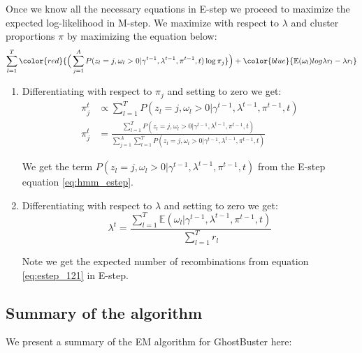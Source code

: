 Once we know all the necessary equations in E-step we proceed to maximize the expected log-likelihood in M-step. We maximize with respect to $\lambda$ and cluster proportions $\pi$ by maximizing the equation below: 
\begin{equation}
    \sum\limits_{l=1}^{T}  \color{red}{ \Big( \sum\limits_{j=1}^{A} P(z_l = j, \omega_l > 0 \vert \gamma^{t-1}, \lambda^{t-1}, \pi^{t-1}, t) \log \pi_j} \Big) + \color{blue}{\mathbb{E}(\omega_l) log \lambda r_l - \lambda r_l }
\end{equation}

\begin{enumerate}
    \item Differentiating with respect to $\pi_j$ and setting to zero we get:  
    \begin{align}
        \pi^{t}_j &\propto \sum\limits_{l=1}^{T} P(z_l = j, \omega_l > 0 \vert \gamma^{t-1}, \lambda^{t-1}, \pi^{t-1}, t) \nonumber \\
        \pi^{t}_j &= \frac{\sum\limits_{l=1}^{T} P(z_l = j, \omega_l > 0 \vert \gamma^{t-1}, \lambda^{t-1}, \pi^{t-1}, t)}{\sum\limits_{j=1}^{A} \sum\limits_{l=1}^{T} P(z_l = j, \omega_l > 0 \vert \gamma^{t-1}, \lambda^{t-1}, \pi^{t-1}, t)}
    \label{eq:pi_updates}
    \end{align}
    
    We get the term $P(z_l = j, \omega_l > 0 \vert \gamma^{t-1}, \lambda^{t-1}, \pi^{t-1}, t)$ from the E-step equation \ref{eq:hmm_estep}. 
    \item Differentiating with respect to $\lambda$ and setting to zero we get:
    \begin{equation}
        \lambda^t = \frac{\sum\limits_{l=1}^{T}\mathbb{E}(\omega_l \vert \gamma^{t-1}, \lambda^{t-1}, \pi^{t-1}, t)}{\sum\limits_{l=1}^{T}r_l}
    \label{eq:lambda_updates}
    \end{equation}
    
    Note we get the expected number of recombinations from equation \ref{eq:estep_121} in E-step.
    
\end{enumerate}

\clearpage

\subsection{Summary of the algorithm}
We present a summary of the EM algorithm for GhostBuster here:


